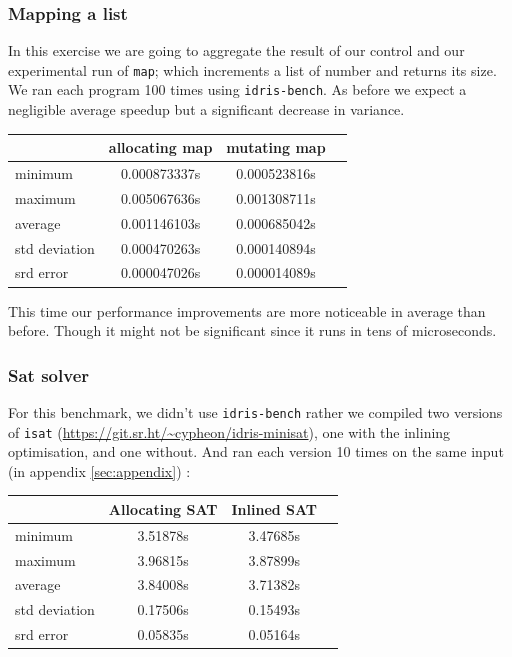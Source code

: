 \documentclass[
]{article}
\begin{document}
\hypertarget{mapping-a-list}{%
\subsubsection{Mapping a list}\label{mapping-a-list}}

In this exercise we are going to aggregate the result of our control and
our experimental run of \texttt{map}; which increments a list of number
and returns its size. We ran each program 100 times using
\texttt{idris-bench}. As before we expect a negligible average speedup
but a significant decrease in variance.

\begin{tabular}{ l | c c c }
          & allocating map & mutating map \\
\hline 
  minimum       & 0.000873337s & 0.000523816s \\
  maximum       & 0.005067636s & 0.001308711s \\ 
  average       & 0.001146103s & 0.000685042s \\
  std deviation & 0.000470263s & 0.000140894s\\
  srd error     & 0.000047026s & 0.000014089s\\
\end{tabular}

This time our performance improvements are more noticeable in average
than before. Though it might not be significant since it runs in tens of
microseconds.

\hypertarget{sat-solver}{%
\subsubsection{Sat solver}\label{sat-solver}}

For this benchmark, we didn't use \texttt{idris-bench} rather we
compiled two versions of \texttt{isat}
(\url{https://git.sr.ht/~cypheon/idris-minisat}), one with the inlining
optimisation, and one without. And ran each version 10 times on the same
input (in appendix \ref{sec:appendix}) :

\begin{tabular}{ l | c c c }
          & Allocating SAT & Inlined SAT \\
\hline 
  minimum       & 3.51878s & 3.47685s \\
  maximum       & 3.96815s & 3.87899s \\
  average       & 3.84008s & 3.71382s \\
  std deviation & 0.17506s & 0.15493s \\
  srd error     & 0.05835s & 0.05164s \\
\end{tabular}
\end{document}
